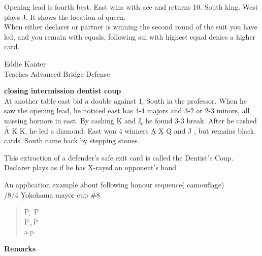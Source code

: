 Opening lead is fourth best. East wins with ace and returns 10.
South king. West plays J. It shows the location of queen.\\

When either declarer or partner is winning the second round of
the suit you have led, and you remain with equals, following
sui with highest equal denies a higher card.\\
\begin{flushright}{
Eddie Kanter\\Teaches Advanced Bridge Defense}
\end{flushright}






\vspace{0.5cm}
{\bf closing intermission dentist coup}\\

At another table east bid a double against 1\d. South ia the
professor. When he saw the opening lead, he noticed east has 4-4 majors
and 3-2 or 2-3 minors, all missing hornors in east. By cashing \c K and
\c J, he found 3-3 break. After he cashed \h A \h K \s K, he led a diamond.
East won 4 winners \d A \d X \h Q and \h J , but remains black cards.
South came back by stepping stones.


This extraction of a defender's safe exit card is called the Dentist's Coup. 
Declarer plays as if he has X-rayed an opponent's hand

\vspace{0.5cm}
An application example about following honour sequence(
camouflage)\\

/8/4 Yokohama mayor cup \#8
\begin{quote}
%
  {}%
  {}
  {}%
  {}%
\end{quote}
\begin{quote}
\begin{bidding}
P \d  \> P \h \\
P  \c \> P \h \\
a.p.
\end{bidding}
\end{quote}
{\bf Remarks}\\

